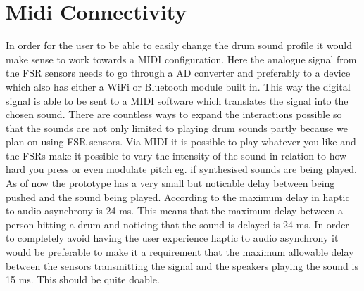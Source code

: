 \section{Midi Connectivity}
In order for the user to be able to easily change the drum sound profile it would make sense to work towards a MIDI configuration. Here the analogue signal from the FSR sensors needs to go through a AD converter and preferably to a device which also has either a WiFi or Bluetooth module built in. This way the digital signal is able to be sent to a MIDI software which translates the signal into the chosen sound. There are countless ways to expand the interactions possible so that the sounds are not only limited to playing drum sounds partly because we plan on using FSR sensors. Via MIDI it is possible to play whatever you like and the FSRs make it possible to vary the intensity of the sound in relation to how hard you press or even modulate pitch eg. if synthesised sounds are being played. As of now the prototype has a very small but noticable delay between being pushed and the sound being played. According to \parencite{Adelstein2003} the maximum delay in haptic to audio asynchrony is 24 ms. This means that the maximum delay between a person hitting a drum and noticing that the sound is delayed is 24 ms. In order to completely avoid having the user experience haptic to audio asynchrony it would be preferable to make it a requirement that the maximum allowable delay between the sensors transmitting the signal and the speakers playing the sound is 15 ms. This should be quite doable.